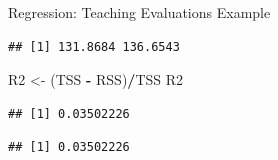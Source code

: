 \documentclass[
  ignorenonframetext,
]{beamer}
\newenvironment{Shaded}{\begin{snugshade}}{\end{snugshade}}
\newcommand{\CommentTok}[1]{\textcolor[rgb]{0.56,0.35,0.01}{\textit{#1}}}
\newcommand{\DecValTok}[1]{\textcolor[rgb]{0.00,0.00,0.81}{#1}}
\newcommand{\FunctionTok}[1]{\textcolor[rgb]{0.13,0.29,0.53}{\textbf{#1}}}
\newcommand{\NormalTok}[1]{#1}
\newcommand{\OtherTok}[1]{\textcolor[rgb]{0.56,0.35,0.01}{#1}}
\newcommand{\SpecialCharTok}[1]{\textcolor[rgb]{0.81,0.36,0.00}{\textbf{#1}}}
\begin{document}
\begin{frame}[fragile]{Regression: Teaching Evaluations Example}
\protect\hypertarget{regression-teaching-evaluations-example-10}{}
\tiny

\begin{Shaded}
\end{Shaded}

\begin{verbatim}
## [1] 131.8684 136.6543
\end{verbatim}

\begin{Shaded}
\begin{Highlighting}[]
\NormalTok{R2 }\OtherTok{\textless{}{-}}\NormalTok{ (TSS }\SpecialCharTok{{-}}\NormalTok{ RSS)}\SpecialCharTok{/}\NormalTok{TSS}
\NormalTok{R2}
\end{Highlighting}
\end{Shaded}

\begin{verbatim}
## [1] 0.03502226
\end{verbatim}

\begin{Shaded}
\end{Shaded}

\begin{verbatim}
## [1] 0.03502226
\end{verbatim}

\normalsize
\end{frame}
\end{document}
